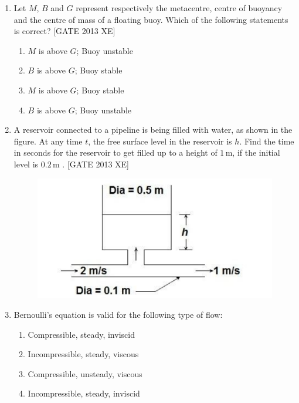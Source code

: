 \documentclass[journal,12pt,onecolumn]{IEEEtran}
\theoremstyle{remark}
\begin{document}
\begin{enumerate}
\item Let $M$, $B$ and $G$ represent respectively the metacentre, centre of buoyancy and the centre of mass of a floating buoy. Which of the following statements is correct? \hfill[GATE 2013 XE]
\begin{multicols}{2}
\begin{enumerate}
    \item $M$ is above $G$; Buoy unstable
    \item $B$ is above $G$; Buoy stable
    \item $M$ is above $G$; Buoy stable
    \item $B$ is above $G$; Buoy unstable
\end{enumerate}
\end{multicols}

\item A reservoir connected to a pipeline is being filled with water, as shown in the figure. At any time $t$, the free surface level in the reservoir is $h$. Find the time in seconds for the reservoir to get filled up to a height of $1\,\mathrm{m}$, if the initial level is $0.2\,\mathrm{m}$ \underline{\hspace{2cm}}. \hfill[GATE 2013 XE] 
\begin{figure}[H]
    \centering
    \includegraphics[width=0.5\columnwidth]{figs/fig1.png}
    \caption{}
    \label{fig:fig1}
\end{figure}
\item  Bernoulli’s equation is valid for the following type of flow:
\begin{multicols}{2}
\begin{enumerate}
    \item Compressible, steady, inviscid
    \item Incompressible, steady, viscous
    \item Compressible, unsteady, viscous
    \item Incompressible, steady, inviscid
\end{enumerate}
\end{multicols}


\end{enumerate}
\end{document}
